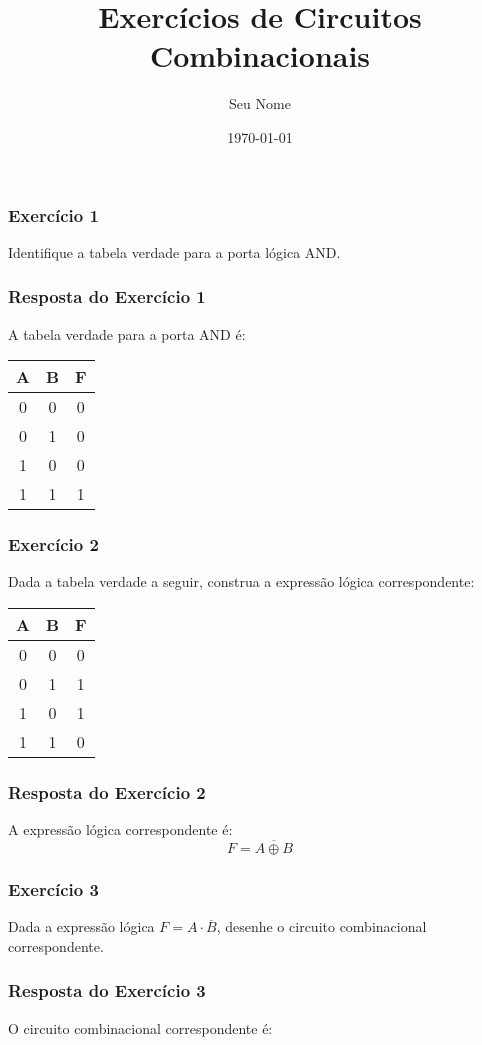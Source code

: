 \documentclass{beamer}
\title{Exercícios de Circuitos Combinacionais}
\author{Seu Nome}
\date{\today}
\begin{document}
	
	\frame{\titlepage}
	
	\begin{frame}
		\frametitle{Exercício 1}
		Identifique a tabela verdade para a porta lógica AND.
	\end{frame}
	
	\begin{frame}
		\frametitle{Resposta do Exercício 1}
		A tabela verdade para a porta AND é:
		\begin{center}
			\begin{tabular}{|c|c|c|}
				\hline
				A & B & F \\
				\hline
				0 & 0 & 0 \\
				0 & 1 & 0 \\
				1 & 0 & 0 \\
				1 & 1 & 1 \\
				\hline
			\end{tabular}
		\end{center}
	\end{frame}
	
	\begin{frame}
		\frametitle{Exercício 2}
		Dada a tabela verdade a seguir, construa a expressão lógica correspondente:
		\begin{center}
			\begin{tabular}{|c|c|c|}
				\hline
				A & B & F \\
				\hline
				0 & 0 & 0 \\
				0 & 1 & 1 \\
				1 & 0 & 1 \\
				1 & 1 & 0 \\
				\hline
			\end{tabular}
		\end{center}
	\end{frame}
	
	\begin{frame}
		\frametitle{Resposta do Exercício 2}
		A expressão lógica correspondente é:
		\[
		F = \overline{A \oplus B}
		\]
	\end{frame}
	
	\begin{frame}
		\frametitle{Exercício 3}
		Dada a expressão lógica \( F = A \cdot \overline{B} \), desenhe o circuito combinacional correspondente.
	\end{frame}
	
	\begin{frame}
		\frametitle{Resposta do Exercício 3}
		O circuito combinacional correspondente é:
		\begin{center}
		\end{center}
	\end{frame}
	
\end{document}
